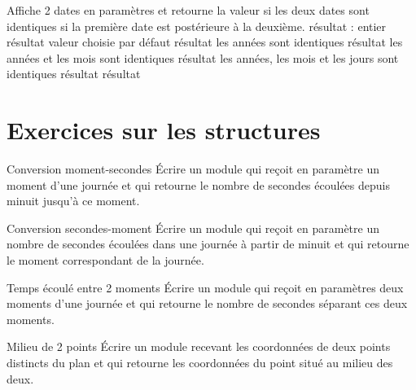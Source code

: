 	\begin{Pseudocode}
	\LComment Affiche 2 dates en paramètres et retourne la valeur
	 si les deux	dates sont identiques
	 si la première date est postérieure à la deuxième.
		\Decl résultat : entier
		\Let  résultat 
		\RComment valeur choisie par défaut
				\Let  résultat 
			\Else \RComment les années sont identiques
						\Let  résultat 
					\Else \RComment les années et les mois sont identiques
								\Let  résultat 
							\Else \RComment les années, les mois et les jours sont identiques
								\Let  résultat 
							\EndIf
						\EndIf
					\EndIf
				\EndIf
			\EndIf
		\EndIf
		\Return résultat
	\EndModule
	\end{Pseudocode}

\section{Exercices sur les structures}

\begin{Exercice}{Conversion moment-secondes}
	Écrire un module qui reçoit en paramètre un
	moment d’une journée et qui retourne le nombre de secondes écoulées
	depuis minuit jusqu’à ce moment.
\end{Exercice}

\begin{Exercice}{Conversion secondes-moment}
	Écrire un module qui reçoit en paramètre un
	nombre de secondes écoulées dans une journée à partir de minuit et qui
	retourne le moment correspondant de la journée.
\end{Exercice}

\begin{Exercice}{Temps écoulé entre 2 moments}
	Écrire un module qui reçoit en paramètres deux
	moments d’une journée et qui retourne le nombre de secondes séparant
	ces deux moments.
\end{Exercice}

\begin{Exercice}{Milieu de 2 points}
	Écrire un module recevant les coordonnées de
	deux points distincts du plan et qui retourne les coordonnées du point
	situé au milieu des deux.
\end{Exercice}

